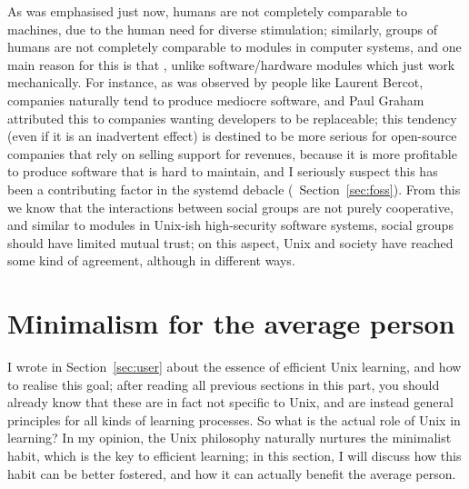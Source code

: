 As was emphasised just now, humans are not completely comparable to machines,
due to the human need for diverse stimulation; similarly, groups of humans
are not completely comparable to modules in computer systems, and one main
reason for this is that , unlike software/hardware modules which just work mechanically.  For
instance, as was observed by people like Laurent Bercot,
companies naturally tend to produce mediocre software, and Paul Graham
attributed this to companies wanting developers to be
replaceable; this tendency (even if it is an inadvertent effect) is destined
to be more serious for open-source companies that rely on selling support for
revenues, because it is more profitable to produce software that is hard to
maintain, and I seriously suspect this has been a contributing factor in the
systemd debacle (\cf~Section~\ref{sec:foss}).  From this we know that the
interactions between social groups are not purely cooperative, and similar
to modules in Unix-ish high-security software systems,
social groups should have limited mutual trust; on this aspect, Unix and
society have reached some kind of agreement, although in different ways.

\section{Minimalism for the average person}\label{sec:worklife}

I wrote in Section~\ref{sec:user} about the essence of efficient Unix learning,
and how to realise this goal; after reading all previous sections in this part,
you should already know that these are in fact not specific to Unix, and are
instead general principles for all kinds of learning processes.  So what is
the actual role of Unix in learning?  In my opinion, the Unix philosophy
naturally nurtures the minimalist habit, which is the key to efficient
learning; in this section, I will discuss how this habit can be better
fostered, and how it can actually benefit the average person.

